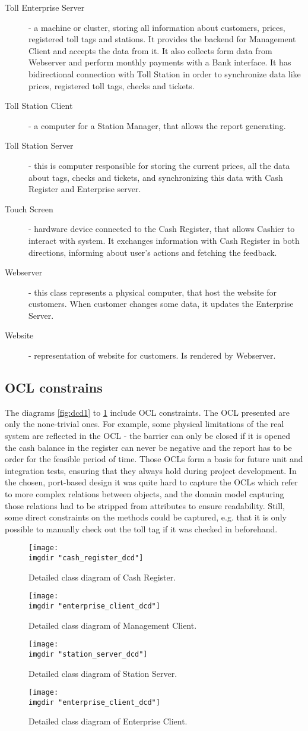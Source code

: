 \begin{description}
\item[Toll Enterprise Server] - a machine or cluster, storing all information about customers, prices, registered toll tags and stations. It provides the backend for Management Client and accepts the data from it. It also collects form data from Webserver and perform monthly payments with a Bank interface. It has bidirectional connection with Toll Station in order to synchronize data like prices, registered toll tags, checks and tickets. 
\item [Toll Station Client] - a computer for a Station Manager, that allows the report generating.
\item [Toll Station Server] - this is computer responsible for storing the current prices, all the data about tags, checks and tickets, and synchronizing this data with Cash Register and Enterprise server.
\item [Touch Screen] - hardware device connected to the Cash Register, that allows Cashier to interact with system. It exchanges information with Cash Register in both directions, informing about user's actions and fetching the feedback. 
\item[Webserver] - this class represents a physical computer, that host the website for customers. When customer changes some data, it updates the Enterprise Server.
\item[Website] - representation of website for customers. Is rendered by Webserver.
\end{description}

\subsection{OCL constrains}
The diagrams \ref{fig:dcd1} to \ref{fig:dcd_ec} include OCL constraints. The OCL presented are only the none-trivial ones. For example, some physical limitations of the real system are reflected in the OCL - the barrier can only be closed if it is opened the cash balance in the register can never be negative and the report has to be order for the feasible period of time. Those OCLs form a basis for future unit and integration tests, ensuring that they always hold during project development. In the chosen, port-based design it was quite hard to capture the OCLs which refer to more complex relations between objects, and the domain model capturing those relations had to be stripped from attributes to ensure readability. Still, some direct constraints on the methods could be captured, e.g. that it is only possible to manually check out the toll tag if it was checked in beforehand.
\begin{figure}
  \centering
  \texttt{[image: \\imgdir "cash\_register\_dcd"]}
  \caption{Detailed class diagram of Cash Register.}
  \label{fig:dcd_cr}
  \texttt{[image: \\imgdir "enterprise\_client\_dcd"]}
  \caption{Detailed class diagram of Management Client.}
  \label{fig:dcd_mc}
  \texttt{[image: \\imgdir "station\_server\_dcd"]}
  \caption{Detailed class diagram of Station Server.}
  \label{fig:dcd_ss}
  \texttt{[image: \\imgdir "enterprise\_client\_dcd"]}
  \caption{Detailed class diagram of Enterprise Client.}
  \label{fig:dcd_ec}
\end{figure}

